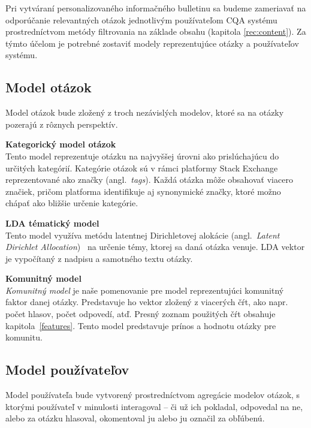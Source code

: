 Pri vytváraní personalizovaného informačného bulletinu sa budeme zameriavať na odporúčanie relevantných otázok jednotlivým
používateľom CQA systému prostredníctvom metódy filtrovania na základe obsahu (kapitola \ref{rec:content}). Za týmto účelom
je potrebné zostaviť modely reprezentujúce otázky a používateľov systému.

\subsection{Model otázok}

Model otázok bude zložený z troch nezávislých modelov, ktoré sa na otázky pozerajú z rôznych perspektív.

\begin{my_enumerate}
\item{\textbf{Kategorický model otázok}\\
Tento model reprezentuje otázku na najvyššej úrovni ako prislúchajúcu do určitých kategórií. Kategórie otázok sú v rámci
platformy Stack Exchange reprezentované ako značky (angl.~\emph{tags}). Každá otázka môže obsahovať viacero značiek, pričom
platforma identifikuje aj synonymické značky, ktoré možno chápať ako bližšie určenie kategórie.}

\item{\textbf{LDA tématický model}\\
Tento model využíva metódu latentnej Dirichletovej alokácie (angl.~\emph{Latent Dirichlet Allocation})~\cite{blei2003latent}
na určenie témy, ktorej sa daná otázka venuje. LDA vektor je vypočítaný z nadpisu a samotného textu otázky.}

\item{\textbf{Komunitný model}\\
\textit{Komunitný model} je naše pomenovanie pre model reprezentujúci komunitný faktor danej otázky. Predstavuje ho vektor
zložený z viacerých čŕt, ako napr. počet hlasov, počet odpovedí, atď. Presný zoznam použitých čŕt obsahuje
kapitola~\ref{features}. Tento model predstavuje prínos a hodnotu otázky pre komunitu.}
\end{my_enumerate}


\subsection{Model používateľov}

Model používateľa bude vytvorený prostredníctvom agregácie modelov otázok, s ktorými používateľ v minulosti interagoval
-- či už ich pokladal, odpovedal na ne, alebo za otázku hlasoval, okomentoval ju alebo ju označil za obľúbenú.

